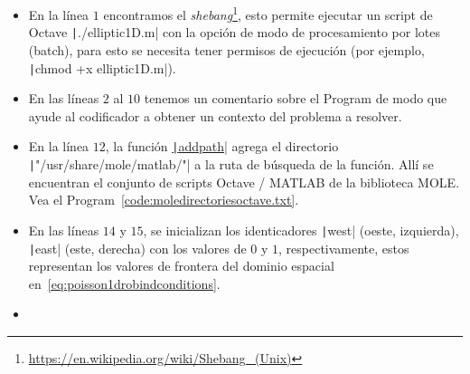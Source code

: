 \begin{itemize}
    \item

          En la línea $1$ encontramos el
          \emph{shebang}\footnote{\url{https://en.wikipedia.org/wiki/Shebang_(Unix)}},
          esto permite ejecutar un script de Octave
          \texttt|./elliptic1D.m| con la opción de modo de
          procesamiento por lotes (batch), para esto se necesita
          tener permisos de ejecución (por ejemplo,
          \texttt|chmod +x elliptic1D.m|).

    \item

          En las líneas $2$ al $10$ tenemos un comentario sobre el
          Program de modo que ayude al codificador a obtener un
          contexto del problema a resolver.

    \item

          En la línea $12$, la función
          \href{https://docs.octave.org/v9.3.0/Manipulating-the-Load-Path.html#index-addpath}{\texttt|addpath|}
          agrega el directorio
          \texttt|"/usr/share/mole/matlab/"| a la ruta de
          búsqueda de la función.
          Allí se encuentran el conjunto de scripts Octave / MATLAB
          de la biblioteca MOLE.
          Vea el Program~\ref{code:moledirectoriesoctave.txt}.

    \item

          En las líneas $14$ y $15$, se inicializan los identicadores
          \texttt|west| (oeste, izquierda),
          \texttt|east| (este, derecha) con los valores
          de $0$ y $1$, respectivamente, estos representan los
          valores de frontera del dominio espacial
          en~\eqref{eq:poisson1drobindconditions}.

    \item


\end{itemize}
